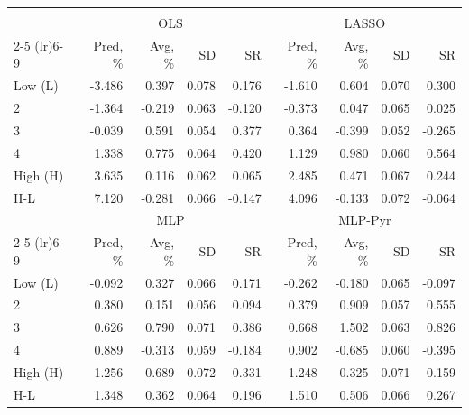 \begin{tabular}{lrrrrrrrr}
\hline \hline \\ [-1.8ex]
 & \multicolumn{4}{c}{OLS} & \multicolumn{4}{c}{LASSO} \\
 \cmidrule(lr){2-5} \cmidrule(lr){6-9}
  & Pred, \% & Avg, \% & SD & SR & Pred, \% & Avg, \% & SD & SR \\
\midrule
Low (L) & -3.486 & 0.397 & 0.078 & 0.176 & -1.610 & 0.604 & 0.070 & 0.300 \\
2 & -1.364 & -0.219 & 0.063 & -0.120 & -0.373 & 0.047 & 0.065 & 0.025 \\
3 & -0.039 & 0.591 & 0.054 & 0.377 & 0.364 & -0.399 & 0.052 & -0.265 \\
4 & 1.338 & 0.775 & 0.064 & 0.420 & 1.129 & 0.980 & 0.060 & 0.564 \\
High (H) & 3.635 & 0.116 & 0.062 & 0.065 & 2.485 & 0.471 & 0.067 & 0.244 \\
H-L & 7.120 & -0.281 & 0.066 & -0.147 & 4.096 & -0.133 & 0.072 & -0.064 \\
\midrule
 & \multicolumn{4}{c}{MLP} & \multicolumn{4}{c}{MLP-Pyr} \\
 \cmidrule(lr){2-5} \cmidrule(lr){6-9}
  & Pred, \% & Avg, \% & SD & SR & Pred, \% & Avg, \% & SD & SR \\
\midrule
Low (L) & -0.092 & 0.327 & 0.066 & 0.171 & -0.262 & -0.180 & 0.065 & -0.097 \\
2 & 0.380 & 0.151 & 0.056 & 0.094 & 0.379 & 0.909 & 0.057 & 0.555 \\
3 & 0.626 & 0.790 & 0.071 & 0.386 & 0.668 & 1.502 & 0.063 & 0.826 \\
4 & 0.889 & -0.313 & 0.059 & -0.184 & 0.902 & -0.685 & 0.060 & -0.395 \\
High (H) & 1.256 & 0.689 & 0.072 & 0.331 & 1.248 & 0.325 & 0.071 & 0.159 \\
H-L & 1.348 & 0.362 & 0.064 & 0.196 & 1.510 & 0.506 & 0.066 & 0.267 \\
\hline \hline
\end{tabular}